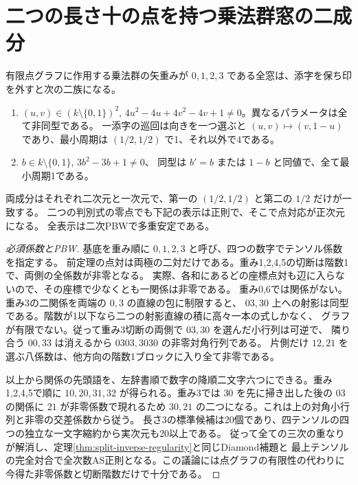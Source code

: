 \section{二つの長さ十の点を持つ乗法群窓の二成分}
\label{sec:simple-weight-finite-windows}
\begin{theorem}\label{thm:simple-weight-finite-windows}
有限点グラフに作用する乗法群の矢重みが $0,1,2,3$ である全窓は、添字を保ち印を外すと次の二族になる。
\begin{enumerate}
\item $(u,v)\in(k\setminus\{0,1\})^2$,
$4u^2-4u+4v^2-4v+1\ne0$。異なるパラメータは全て非同型である。
一添字の巡回は向きを一つ選ぶと $(u,v)\mapsto(v,1-u)$ であり、最小周期は
$(1/2,1/2)$ で1、それ以外で4である。
\item $b\in k\setminus\{0,1\}$, $3b^2-3b+1\ne0$、
同型は $b'=b$ または $1-b$ と同値で、全て最小周期1である。
\end{enumerate}
両成分はそれぞれ二次元と一次元で、第一の $(1/2,1/2)$ と第二の $1/2$ だけが一致する。
二つの判別式の零点でも下記の表示は正則で、そこで点対応が正次元になる。
全表示は二次PBWで多重安定である。
\end{theorem}

\begin{proof}[必須係数とPBW]
基底を重み順に $0,1,2,3$ と呼び、四つの数字でテンソル係数を指定する。
前定理の点対は両極の二対だけである。重み1,2,4,5の切断は階数1で、両側の全係数が非零となる。
実際、各和にあるどの座標点対も辺に入らないので、その座標で少なくとも一関係は非零である。
重み0,6では関係がない。重み3の二関係を両端の $0,3$ の直線の包に制限すると、
$03,30$ 上への射影は同型である。階数が1以下なら二つの射影直線の積に高々一本の式しかなく、
グラフが有限でない。従って重み3切断の両側で $03,30$ を選んだ小行列は可逆で、
隣り合う $00,33$ は消えるから $0303,3030$ の非零対角行列である。
片側だけ $12,21$ を選ぶ八係数は、他方向の階数1ブロックに入り全て非零である。

以上から関係の先頭語を、左辞書順で数字の降順二文字六つにできる。重み1,2,4,5で順に
$10,20,31,32$ が得られる。重み3では $30$ を先に掃き出した後の $03$ の関係に
$21$ が非零係数で現れるため $30,21$ の二つになる。これは上の対角小行列と非零の交差係数から従う。
長さ3の標準候補は20個であり、四テンソルの四つの独立な一文字縮約から実次元も20以上である。
従って全ての三次の重なりが解消し、定理\ref{thm:split-inverse-regularity}と同じDiamond補題と
最上テンソルの完全対合で全次数AS正則となる。この議論には点グラフの有限性の代わりに
今得た非零係数と切断階数だけで十分である。
\end{proof}

